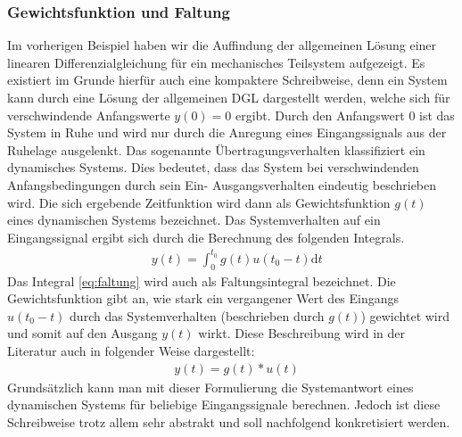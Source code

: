 \subsubsection{Gewichtsfunktion und Faltung}
%
Im vorherigen Beispiel haben wir die Auffindung der allgemeinen Lösung einer linearen Differenzialgleichung für ein mechanisches Teilsystem aufgezeigt. Es existiert im Grunde hierfür auch eine kompaktere Schreibweise, denn ein System kann durch eine Lösung der allgemeinen DGL dargestellt werden, welche sich für verschwindende Anfangswerte $y(0)=0$ ergibt. Durch den Anfangswert 0 ist das System in Ruhe und wird nur durch die Anregung eines Eingangssignals aus der Ruhelage ausgelenkt. Das sogenannte Übertragungsverhalten klassifiziert ein dynamisches Systems. Dies bedeutet, dass das System bei verschwindenden Anfangsbedingungen durch sein Ein- Ausgangsverhalten eindeutig beschrieben wird. Die sich ergebende Zeitfunktion wird dann als Gewichtsfunktion $g(t)$ eines dynamischen Systems bezeichnet. Das Systemverhalten auf ein Eingangssignal ergibt sich durch die Berechnung des folgenden Integrals. 
%
\begin{equation}
\begin{aligned}
&y(t)=\int_{0}^{t_{0}}g(t)u(t_{0}-t)\text{d}t\label{eq:faltung}
\end{aligned}
\end{equation}
%
Das Integral \eqref{eq:faltung} wird auch als Faltungsintegral bezeichnet. Die Gewichtsfunktion gibt an, wie stark ein vergangener Wert des Eingangs $u(t_{0}-t)$ durch das Systemverhalten (beschrieben durch $g(t)$) gewichtet wird und somit auf den Ausgang $y(t)$ wirkt. Diese Beschreibung wird in der Literatur auch in folgender Weise dargestellt:
%
\begin{equation}
\begin{aligned}
&y(t)=g(t)*u(t)
\end{aligned}
\end{equation}
%
Grundsätzlich kann man mit dieser Formulierung die Systemantwort eines dynamischen Systems für beliebige Eingangssignale berechnen. Jedoch ist diese Schreibweise trotz allem sehr abstrakt und soll nachfolgend konkretisiert werden. 
%
